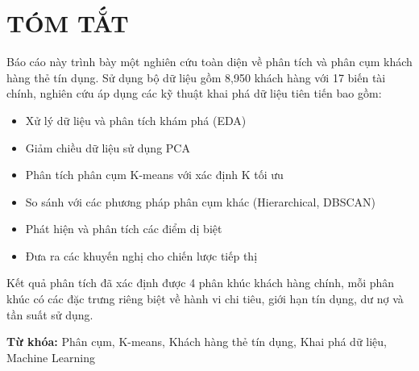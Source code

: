 \documentclass[12pt, a4paper, twoside]{report}
\begin{document}
\newpage

\chapter*{TÓM TẮT}

Báo cáo này trình bày một nghiên cứu toàn diện về phân tích và phân cụm khách hàng thẻ tín dụng. Sử dụng bộ dữ liệu gồm 8,950 khách hàng với 17 biến tài chính, nghiên cứu áp dụng các kỹ thuật khai phá dữ liệu tiên tiến bao gồm:

\begin{itemize}
    \item Xử lý dữ liệu và phân tích khám phá (EDA)
    \item Giảm chiều dữ liệu sử dụng PCA
    \item Phân tích phân cụm K-means với xác định K tối ưu
    \item So sánh với các phương pháp phân cụm khác (Hierarchical, DBSCAN)
    \item Phát hiện và phân tích các điểm dị biệt
    \item Đưa ra các khuyến nghị cho chiến lược tiếp thị
\end{itemize}

Kết quả phân tích đã xác định được 4 phân khúc khách hàng chính, mỗi phân khúc có các đặc trưng riêng biệt về hành vi chi tiêu, giới hạn tín dụng, dư nợ và tần suất sử dụng.

\textbf{Từ khóa:} Phân cụm, K-means, Khách hàng thẻ tín dụng, Khai phá dữ liệu, Machine Learning

\newpage










\appendix



\newpage
{}


\end{document}
